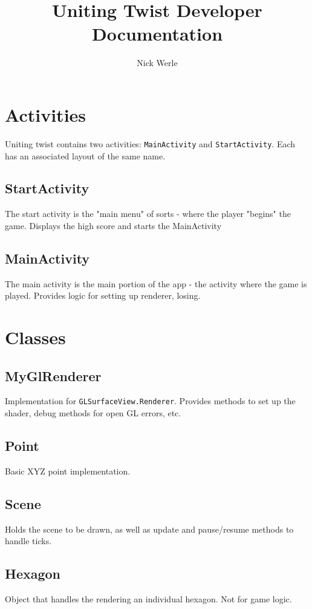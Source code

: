 \documentclass{article}
\title{Uniting Twist Developer Documentation}
\author{Nick Werle}
\begin{document}
\maketitle
\section{Activities}
Uniting twist contains two activities: \texttt{MainActivity} and \texttt{StartActivity}. Each has an associated layout of the same name.

\subsection{StartActivity}
The start activity is the "main menu" of sorts - where the player "begins" the game. Displays the high score and starts the MainActivity

\subsection{MainActivity}
The main activity is the main portion of the app - the activity where the game is played. Provides logic for setting up renderer, losing.

\section{Classes}
\subsection{MyGlRenderer}
Implementation for \texttt{GLSurfaceView.Renderer}. Provides methods to set up the shader, debug methods for open GL errors, etc.

\subsection{Point}
Basic XYZ point implementation.

\subsection{Scene}
Holds the scene to be drawn, as well as update and pause/resume methods to handle ticks. 

\subsection{Hexagon}
Object that handles the rendering an individual hexagon. Not for game logic.
\end{document}

